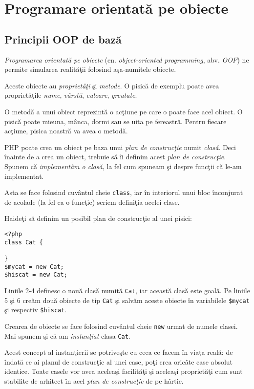 \chapter{Programare orientată pe obiecte}
\section{Principii OOP de bază}
\textsl{Programarea orientată pe obiecte} (en. \textsl{object-oriented programming}, abv. \textsl{OOP})
ne permite simularea realităţii folosind aşa-numitele obiecte.

Aceste obiecte au \textsl{proprietăţi} şi \textsl{metode}. O pisică de exemplu poate avea
proprietăţile \textit{nume}, \textit{vârstă}, \textit{culoare}, \textit{greutate}.

O metodă a unui obiect reprezintă o acţiune pe care o poate face acel obiect. O pisică
poate mieuna, mânca, dormi sau se uita pe fereastră. Pentru fiecare acţiune,
pisica noastră va avea o metodă.

PHP poate crea un obiect pe baza unui \textit{plan de construcţie} numit \textsl{clasă}.
Deci înainte de a crea un obiect, trebuie să îi definim acest \textit{plan de construcţie}.
Spunem că \textit{implementăm o clasă}, la fel cum spuneam şi despre funcţii
că le-am implementat.

Asta se face folosind cuvântul cheie \texttt{class}, iar în interiorul unui bloc înconjurat
de acolade (la fel ca o funcţie) scriem definiţia acelei clase.

Haideţi să definim un posibil plan de construcţie al unei pisici:

\begin{lstlisting}[title=An empty class]
<?php
class Cat {

}
$mycat = new Cat;
$hiscat = new Cat;
\end{lstlisting}

Liniile 2-4 definesc o nouă clasă numită \texttt{Cat}, iar această clasă este goală.
Pe liniile 5 şi 6 creăm două obiecte de tip \texttt{Cat} şi salvăm aceste obiecte
în variabilele \texttt{\$mycat} şi respectiv \texttt{\$hiscat}.

Crearea de obiecte se face folosind cuvântul cheie \texttt{new} urmat de numele clasei.
Mai spunem şi că am \textsl{instanţiat} clasa \texttt{Cat}.

Acest concept al instanţierii se potriveşte cu ceea ce facem în viaţa reală:
de îndată ce ai planul de construcţie al unei case, poţi crea oricâte case
absolut identice. Toate casele vor avea aceleaşi facilităţi şi aceleaşi
proprietăţi cum sunt stabilite de arhitect în acel \textit{plan de construcţie}
de pe hârtie.

